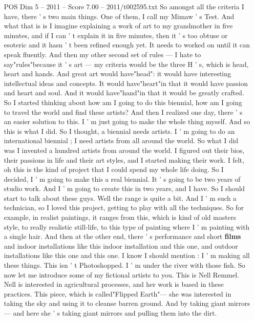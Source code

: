 \begin{textsample}{POS Dim 5 – 2011 – Score 7.00 – 2011/t002595.txt}
So amongst all the criteria I have, there ' s two main things.
One of them, I call my Mimaw ' s Test.
And what that is is I imagine explaining a work of art to my grandmother in five minutes, and if I can ' t explain it in five minutes, then it ' s too obtuse or esoteric and it hasn ' t been refined enough yet.
It needs to worked on until it can speak fluently.
And then my other second set of rules — I hate to say"rules"because it ' s art — my criteria would be the three H ' s, which is head, heart and hands.
And great art would have"head": it would have interesting intellectual ideas and concepts.
It would have"heart"in that it would have passion and heart and soul.
And it would have"hand"in that it would be greatly crafted.
So I started thinking about how am I going to do this biennial, how am I going to travel the world and find these artists?
And then I realized one day, there ' s an easier solution to this.
I ' m just going to make the whole thing myself.
And so this is what I did.
So I thought, a biennial needs artists.
I ' m going to do an international biennial ; I need artists from all around the world.
So what I did was I invented a hundred artists from around the world.
I figured out their bios, their passions in life and their art styles, and I started making their work.
I felt, oh this is the kind of project that I could spend my whole life doing.
So I decided, I ' m going to make this a real biennial.
It ' s going to be two years of studio work.
And I ' m going to create this in two years, and I have.
So I should start to talk about these guys.
Well the range is quite a bit.
And I ' m such a technician, so I loved this project, getting to play with all the techniques.
So for example, in realist paintings, it ranges from this, which is kind of old masters style, to really realistic still-life, to this type of painting where I ' m painting with a single hair.
And then at the other end, there ' s performance and short \textbf{films} and indoor installations like this indoor installation and this one, and outdoor installations like this one and this one.
I know I should mention : I ' m making all these things.
This isn ' t Photoshopped.
I ' m under the river with those fish.
So now let me introduce some of my fictional artists to you.
This is Nell Remmel.
Nell is interested in agricultural processes, and her work is based in these practices.
This piece, which is called"Flipped Earth"— she was interested in taking the sky and using it to cleanse barren ground.
And by taking giant mirrors — and here she ' s taking giant mirrors and pulling them into the dirt.

\end{textsample}
